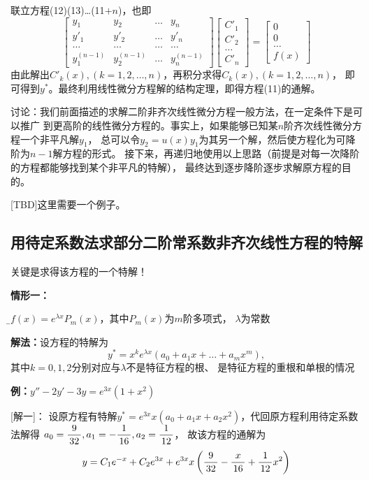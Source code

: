 \begin{shaded}
	联立方程(12)(13)\ldots(11$+n$)，也即
	$$\left[\begin{array}{cccc}
	y_1 & y_2 & \ldots & y_n\\
	y'_1 & y'_2 & \ldots & y'_n\\
	\ldots & \ldots & \ldots &\ldots\\
	y^{(n-1)}_1 & y^{(n-1)}_2 & \ldots & y^{(n-1)}_n
	\end{array}
	\right]
	\left[\begin{array}{c}
	C'_1 \\ C'_2 \\ \ldots \\ C'_n 
	\end{array}\right]
	=\left[\begin{array}{c}
	0 \\ 0 \\ \ldots \\ f(x)
	\end{array}\right]$$
	由此解出$C'_k(x),(k=1,2,\ldots,n)$，再积分求得$C_k(x),(k=1,2,\ldots,n)$，
	即可得到$y^*$。最终利用线性微分方程解的结构定理，即得方程(11)的通解。
	
	
	讨论：我们前面描述的求解二阶非齐次线性微分方程一般方法，在一定条件下是可以推广
	到更高阶的线性微分方程的。事实上，如果能够已知某$n$阶齐次线性微分方程一个非平凡解$y_1$，
	总可以令$y_2=u(x)y_1$为其另一个解，然后使方程化为可降阶为$n-1$解方程的形式。
	接下来，再递归地使用以上思路（前提是对每一次降阶的方程都能够找到某个非平凡的特解），
	最终达到逐步降阶逐步求解原方程的目的。
	
	[TBD]这里需要一个例子。
\end{shaded}

\subsection{用待定系数法求部分二阶常系数非齐次线性方程的特解}

关键是求得该方程的一个特解！

{\bf 情形一：}{\b$f(x)=e^{\lambda x}P_m(x)$，其中$P_m(x)$为$m$阶多项式，
$\lambda$为常数

{\bf 解法：}设方程的特解为
$$y^*=x^ke^{\lambda x}(a_0+a_1x+\ldots+a_mx^m),$$
其中$k=0,1,2$分别对应与$\lambda$不是特征方程的根、
是特征方程的重根和单根的情况}


{\bf 例：}$y''-2y'-3y=e^{3x}(1+x^2)$

[解一]：
设原方程有特解$y^*=e^{3x}x(a_0+a_1x+a_2x^2)$，代回原方程利用待定系数法解得
$a_0=\displaystyle\frac{\,{9}\,}{\,{32}\,},a_1=-\displaystyle\frac{\,{1}\,}{\,{16}\,},a_2=\displaystyle\frac{\,{1}\,}{\,{12}\,}$，
故该方程的通解为
$$y=C_1e^{-x}+C_2e^{3x}+e^{3x}x\left(\displaystyle\frac{\,{9}\,}{\,{32}\,}-\displaystyle\frac{\,{x}\,}{\,{16}\,}+\displaystyle\frac{\,{1}\,}{\,{12}\,}x^2\right)$$

